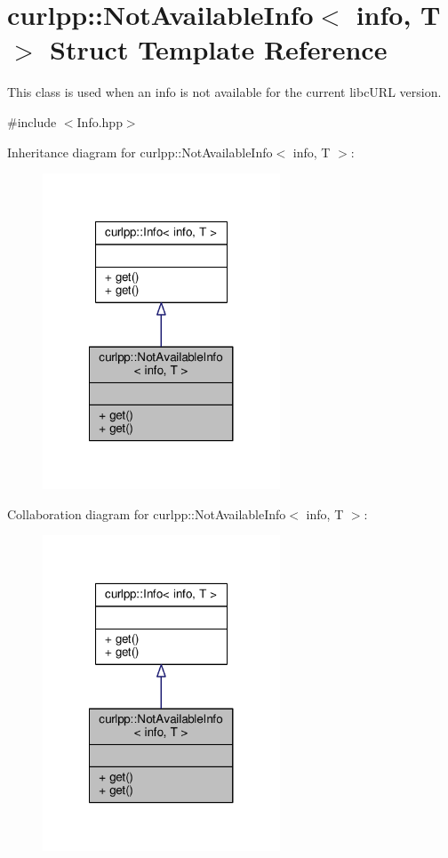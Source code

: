 \hypertarget{structcurlpp_1_1NotAvailableInfo}{\section{curlpp\-:\-:Not\-Available\-Info$<$ info, T $>$ Struct Template Reference}
\label{structcurlpp_1_1NotAvailableInfo}
}


This class is used when an info is not available for the current libc\-U\-R\-L version.  




{\ttfamily \#include $<$Info.\-hpp$>$}



Inheritance diagram for curlpp\-:\-:Not\-Available\-Info$<$ info, T $>$\-:
\nopagebreak
\begin{figure}[H]
\begin{center}
\leavevmode
\includegraphics[width=200pt]{structcurlpp_1_1NotAvailableInfo__inherit__graph}
\end{center}
\end{figure}


Collaboration diagram for curlpp\-:\-:Not\-Available\-Info$<$ info, T $>$\-:
\nopagebreak
\begin{figure}[H]
\begin{center}
\leavevmode
\includegraphics[width=200pt]{structcurlpp_1_1NotAvailableInfo__coll__graph}
\end{center}
\end{figure}
